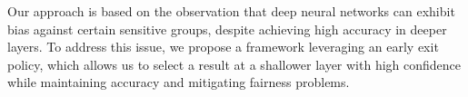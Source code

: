 


Our approach is based on the observation that deep neural networks can exhibit bias against certain sensitive groups, despite achieving high accuracy in deeper layers. To address this issue, we propose a framework leveraging an early exit policy, which allows us to select a result at a shallower layer with high confidence while maintaining accuracy and mitigating fairness problems.


